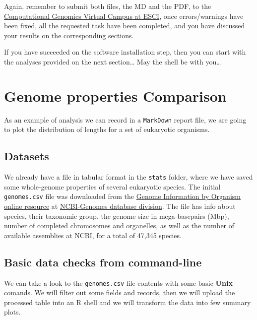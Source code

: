 \documentclass[10pt,a4paper,]{article}
\begin{document}
Again, remember to submit both files, the MD and the PDF, to the
\href{https://aula.esci.upf.edu/course/view.php?id=5915}{Computational Genomics Virtual Campus at ESCI},
once errors/warnings have been fixed, all the requested task have been
completed, and you have discussed your results on the corresponding
sections.

If you have succeeded on the software installation step, then you can
start with the analyses provided on the next section\ldots{} May the
shell be with you\ldots{}

\newpage

\hypertarget{genome-properties-comparison}{%
\section{Genome properties
Comparison}\label{genome-properties-comparison}}

As an example of analysis we can record in a \texttt{MarkDown} report
file, we are going to plot the distribution of lengths for a set of
eukaryotic organisms.

\hypertarget{datasets}{%
\subsection{Datasets}\label{datasets}}

We already have a file in tabular format in the \texttt{stats} folder,
where we have saved some whole-genome properties of several eukaryotic
species. The initial \texttt{genomes.csv} file was downloaded from the
\href{https://www.ncbi.nlm.nih.gov/genome/browse\#!/overview/}{Genome
Information by Organism online resource} at
\href{https://www.ncbi.nlm.nih.gov/genome/}{NCBI-Genomes database
division}. The file has info about species, their taxonomic group, the
genome size in mega-basepairs (Mbp), number of completed chromosomes and
organelles, as well as the number of available assemblies at NCBI, for a
total of 47,345 species.

\hypertarget{basic-data-checks-from-command-line}{%
\subsection{Basic data checks from
command-line}\label{basic-data-checks-from-command-line}}

We can take a look to the \texttt{genomes.csv} file contents with some
basic \textbf{Unix} comands. We will filter out some fields and records,
then we will upload the processed table into an R shell and we will
transform the data into few summary plots.
\end{document}
